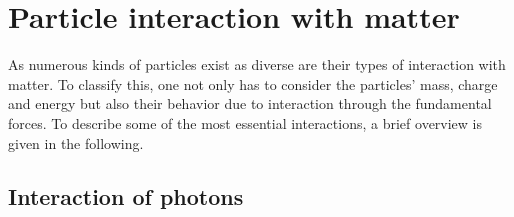 
\chapter{Particle interaction with matter} \label{ch:particles}

As numerous kinds of particles exist as diverse are their types of interaction with matter. To classify this, one not only has to consider the particles' mass, charge and energy but also their behavior due to interaction through the fundamental forces. To describe some of the most essential interactions, a brief overview is given in the following.      

\section{Interaction of photons}

